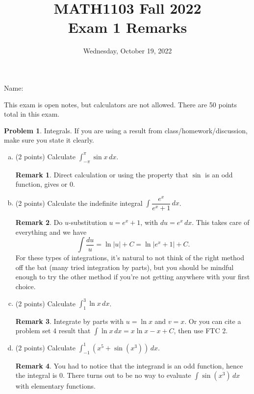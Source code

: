 \documentclass[11pt,oneside]{amsart}
\title{MATH1103 Fall 2022\\
Exam 1 Remarks}
\author{Wednesday, October 19, 2022}
\theoremstyle{definition}
\newtheorem{problem}{Problem}
\newtheorem*{remark}{Remark}
\begin{document}
\maketitle

Name: \underline{\hspace{6cm}}

This exam is open notes, but calculators are not allowed. There are 50 points total in this exam.

\begin{problem}
Integrals. If you are using a result from class/homework/discussion, make sure you state it clearly.
\begin{enumerate}[(a)]
  \item (2 points) Calculate $\displaystyle\int_{-\pi}^\pi \sin x\,dx$.
        \begin{remark}
          Direct calculation or using the property that $\sin$ is an odd function, gives or 0.
        \end{remark}
        \vfill
  \item (2 points) Calculate the indefinite integral $\displaystyle\int \dfrac{e^x}{e^x+1}\, dx$.
        \begin{remark}
          Do $u$-substitution $u=e^x+1$, with $du=e^x\,dx$. This takes care of everything and we have
          \[\int \frac{du}u=\ln|u|+C=\ln|e^x+1|+C.\]
          For these types of integrations, it's natural to not think of the right method off the bat (many tried integration by parts), but you should be mindful enough to try the other method if you're not getting anywhere with your first choice.
        \end{remark}
        \vfill
  \item (2 points) Calculate $\displaystyle\int_1 ^3 \ln x\,dx$.
        \begin{remark}
          Integrate by parts with $u=\ln x$ and $v=x$. Or you can cite a problem set 4 result that $\int\ln x\,dx=x\ln x-x+C$, then use FTC 2.
        \end{remark}
        \vfill
  \item (2 points) Calculate $\displaystyle\int_{-1}^1 (x^5+\sin(x^3))\,dx$.
        \begin{remark}
          You had to notice that the integrand is an odd function, hence the integral is 0. There turns out to be no way to evaluate $\int\sin(x^3)\,dx$ with elementary functions.

\end{remark}
\end{enumerate}
\end{problem}
\end{document}
